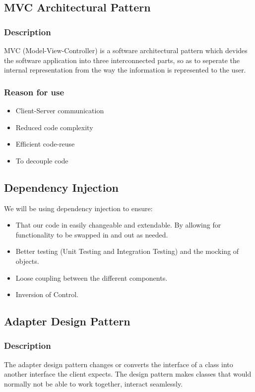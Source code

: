 \subsection{MVC Architectural Pattern}
	\subsubsection{Description}
	MVC (Model-View-Controller) is a software architectural pattern which devides the software application into three interconnected parts, so as to seperate the internal representation from the way the information is represented to the user.
	\subsubsection{Reason for use}
	\begin{itemize}
		\item{Client-Server communication}
		\item{Reduced code complexity}
		\item{Efficient code-reuse}
		\item{To decouple code}
	\end{itemize}
	
\subsection {Dependency Injection}
	We will be using dependency injection to ensure:
	\begin{itemize}
		\item That our code in easily changeable and extendable. By allowing for functionality to be swapped in and out as needed. \cite{dependency1}
		\item Better testing (Unit Testing and Integration Testing) and the mocking of objects. \cite{dependency1}
		\item Loose coupling between the different components. \cite{dependency2}
		\item Inversion of Control. \cite{dependency2}
	\end{itemize}

\subsection{Adapter Design Pattern}
	\subsubsection{Description}
	The adapter design pattern changes or converts the interface of a class into another interface the client expects. The design pattern makes classes that would normally not be able to work together, interact seamlessly.
	
